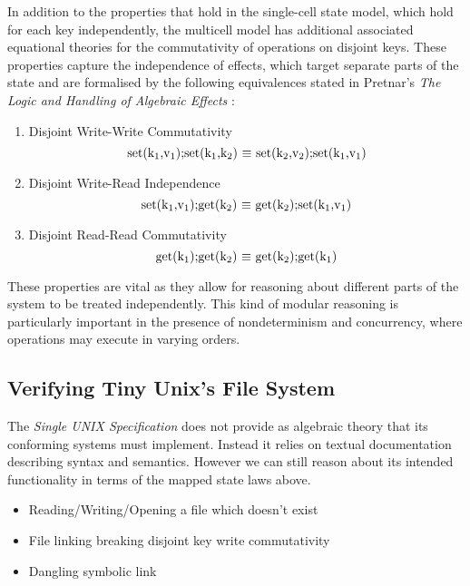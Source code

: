 \documentclass[logo,bsc,singlespacing,parskip]{infthesis}
\begin{document}
In addition to the properties that hold in the single-cell state model, which hold for each key independently,  the multicell model has additional associated equational theories for the commutativity of operations on disjoint keys. These properties capture the independence of effects, which target separate parts of the state and are formalised by the following equivalences stated in Pretnar's \textit{The Logic and Handling of
Algebraic Effects} \cite{Pretnar:2010}:
\begin{enumerate}
    \item Disjoint Write-Write Commutativity \[ \text{set(k\textsubscript{1},v\textsubscript{1});set(k\textsubscript{1},k\textsubscript{2}) $\equiv$ set(k\textsubscript{2},v\textsubscript{2});set(k\textsubscript{1},v\textsubscript{1})} \] 
    \item Disjoint Write-Read Independence \[ \text{set(k\textsubscript{1},v\textsubscript{1});get(k\textsubscript{2}) $\equiv$ get(k\textsubscript{2});set(k\textsubscript{1},v\textsubscript{1})} \] 
    \item Disjoint Read-Read Commutativity \[\text{get(k\textsubscript{1});get(k\textsubscript{2}) $\equiv$ get(k\textsubscript{2});get(k\textsubscript{1})} \] 
\end{enumerate}

These properties are vital as they allow for reasoning about different parts of the system to be treated independently. This kind of modular reasoning is particularly important in the presence of nondeterminism and concurrency, where operations may execute in varying orders.


\subsection{Verifying Tiny Unix's File System}

The \textit{Single UNIX Specification} \cite{SUSv4} does not provide as algebraic theory that its conforming systems must implement. Instead it relies on textual documentation describing syntax and semantics. However we can still reason about its intended functionality in terms of the mapped state laws above.

\begin{itemize}
    \item Reading/Writing/Opening a file which doesn't exist
    \item File linking breaking disjoint key write commutativity 
    \item Dangling symbolic link
\end{itemize}
\end{document}
